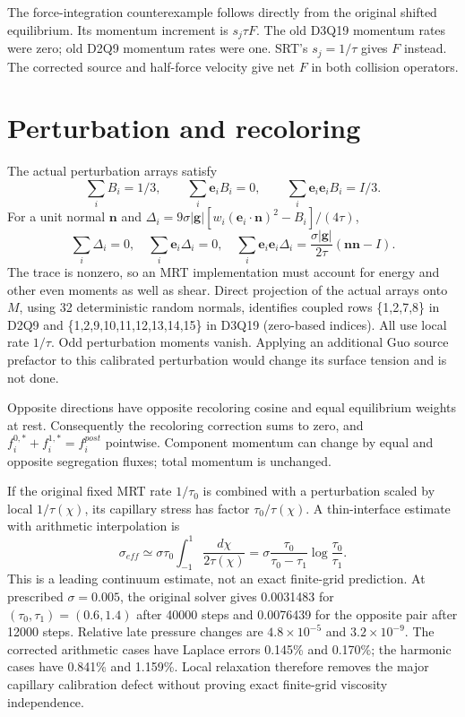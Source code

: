 \documentclass[11pt]{article}
\begin{document}
The force-integration counterexample follows directly from the original
shifted equilibrium. Its momentum increment is $s_j\tau F$.
The old D3Q19 momentum rates were zero; old D2Q9 momentum rates were one.
SRT's $s_j=1/\tau$ gives $F$ instead. The corrected source and half-force
velocity give net $F$ in both collision operators.

\section{Perturbation and recoloring}
The actual perturbation arrays satisfy
\begin{equation}
 \sum_iB_i=1/3,\qquad \sum_i\bm e_iB_i=0,\qquad
 \sum_i\bm e_i\bm e_iB_i=I/3.
\end{equation}
For a unit normal $\bm n$ and
$\Delta_i=9\sigma|\bm g|[w_i(\bm e_i\cdot\bm n)^2-B_i]/(4\tau)$,
\begin{equation}
 \sum_i\Delta_i=0,\quad \sum_i\bm e_i\Delta_i=0,\quad
 \sum_i\bm e_i\bm e_i\Delta_i=\frac{\sigma|\bm g|}{2\tau}(\bm n\bm n-I).
\end{equation}
The trace is nonzero, so an MRT implementation must account for energy and
other even moments as well as shear. Direct projection of the actual arrays
onto $M$, using 32 deterministic random normals, identifies coupled rows
\{1,2,7,8\} in D2Q9 and \{1,2,9,10,11,12,13,14,15\} in D3Q19
(zero-based indices). All use local rate $1/\tau$. Odd perturbation moments
vanish. Applying an additional Guo source prefactor to this calibrated
perturbation would change its surface tension and is not done.

Opposite directions have opposite recoloring cosine and equal equilibrium
weights at rest. Consequently the recoloring correction sums to zero, and
$f_i^{0,*}+f_i^{1,*}=f_i^{post}$ pointwise. Component momentum can change by
equal and opposite segregation fluxes; total momentum is unchanged.

If the original fixed MRT rate $1/\tau_0$ is combined with a perturbation
scaled by local $1/\tau(\chi)$, its capillary stress has factor
$\tau_0/\tau(\chi)$. A thin-interface estimate with arithmetic interpolation is
\begin{equation}
 \sigma_{eff}\simeq\sigma\tau_0
 \int_{-1}^{1}\frac{d\chi}{2\tau(\chi)}
 =\sigma\frac{\tau_0}{\tau_0-\tau_1}\log\frac{\tau_0}{\tau_1}.
\end{equation}
This is a leading continuum estimate, not an exact finite-grid prediction.
At prescribed $\sigma=0.005$, the original solver gives 0.0031483 for
$(\tau_0,\tau_1)=(0.6,1.4)$ after 40000 steps and 0.0076439 for the opposite
pair after 12000 steps. Relative late pressure changes are
$4.8\times10^{-5}$ and $3.2\times10^{-9}$. The corrected arithmetic cases have
Laplace errors 0.145\% and 0.170\%; the harmonic cases have 0.841\% and
1.159\%. Local relaxation therefore removes the major capillary calibration
defect without proving exact finite-grid viscosity independence.
\end{document}
